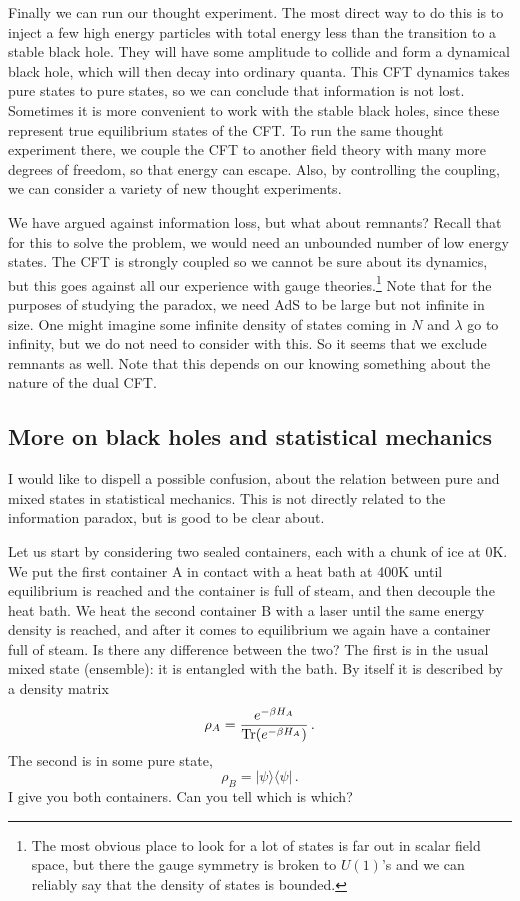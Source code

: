 \documentclass[12pt]{article}
\newcommand{\be}{\begin{equation}}
\newcommand{\ee}{\end{equation}}
\begin{document}
Finally we can run our thought experiment.  The most direct way to do this is to inject a few high energy particles with total energy less than the transition to a stable black hole.  They will have some amplitude to collide and form a dynamical black hole, which will then decay into ordinary quanta.  This CFT dynamics takes pure states to pure states, so we can conclude that information is not lost.  Sometimes it is more convenient to work with the stable black holes, since these represent true equilibrium states of the CFT.  To run the same thought experiment there, we couple the CFT to another field theory with many more degrees of freedom, so that energy can escape.  Also, by controlling the coupling, we can consider a variety of new thought experiments.

We have argued against information loss, but what about remnants?  Recall that for this to solve the problem, we would need an unbounded number of low energy states.  The CFT is strongly coupled so we cannot be sure about its dynamics, but this goes against all our experience with gauge theories.\footnote{The most obvious place to look for a lot of states is far out in scalar field space, but there the gauge symmetry is broken to $U(1)$'s and we can reliably say that the density of states is bounded.}  Note that for the purposes  of studying the paradox, we need AdS to be large but not infinite in size.  One might imagine some infinite density of states coming in $N$ and $\lambda$ go to infinity, but we do not need to consider with this.  So it seems that we exclude remnants as well.  Note that this depends on our knowing something about the nature of the dual CFT. 

\subsection{More on black holes and statistical  mechanics}

I would like to dispell a possible confusion, about the relation between pure and mixed states in statistical mechanics.  This is not directly related to the information paradox, but is good to be clear about.  

Let us start by considering two sealed containers, each with a chunk of ice at 0K.  We put the first container A in contact with a heat bath at 400K until equilibrium is reached and the container is full of steam, and then decouple the heat bath.  We heat the second container B with a laser until the same energy density is reached, and after it comes to equilibrium we again have a container full of steam.  Is there any difference between the two?  The first is in the usual mixed state (ensemble): it is entangled with the bath.  By itself it is described by a density matrix
\be
\rho_A = \frac{e^{-\beta H_A}}{{\rm Tr}(e^{-\beta H_A}) }\,.
\ee
The second is in some pure state,
\be
\rho_B = | \psi \rangle\langle \psi | \,.
\ee
I give you both containers.  Can you tell which is which?
\end{document}
